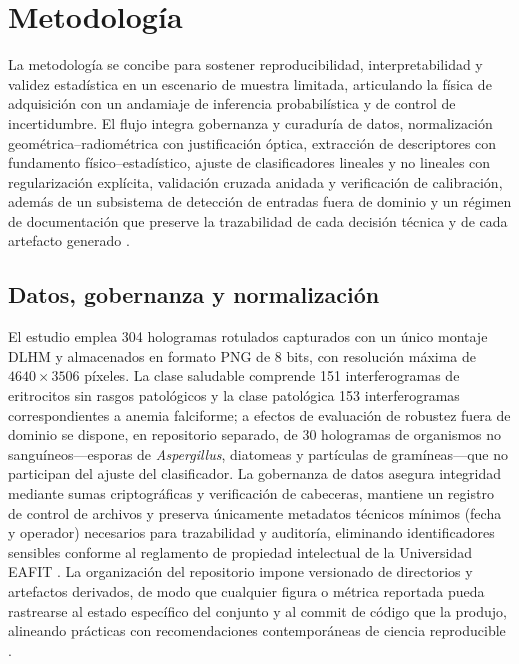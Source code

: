 \chapter{Metodología}\label{chap:metodologia}
La metodología se concibe para sostener reproducibilidad, interpretabilidad y validez estadística en un escenario de muestra limitada, articulando la física de adquisición con un andamiaje de inferencia probabilística y de control de incertidumbre. El flujo integra gobernanza y curaduría de datos, normalización geométrica–radiométrica con justificación óptica, extracción de descriptores con fundamento físico–estadístico, ajuste de clasificadores lineales y no lineales con regularización explícita, validación cruzada anidada y verificación de calibración, además de un subsistema de detección de entradas fuera de dominio y un régimen de documentación que preserve la trazabilidad de cada decisión técnica y de cada artefacto generado \cite{Tsamardinos2022,Vabalas2019,Pedregosa2011,EAFIT2018}.

\section{Datos, gobernanza y normalización}
El estudio emplea 304 hologramas rotulados capturados con un único montaje DLHM y almacenados en formato PNG de 8 bits, con resolución máxima de \(4640\times3506\) píxeles. La clase saludable comprende 151 interferogramas de eritrocitos sin rasgos patológicos y la clase patológica 153 interferogramas correspondientes a anemia falciforme; a efectos de evaluación de robustez fuera de dominio se dispone, en repositorio separado, de 30 hologramas de organismos no sanguíneos—esporas de \emph{Aspergillus}, diatomeas y partículas de gramíneas—que no participan del ajuste del clasificador. La gobernanza de datos asegura integridad mediante sumas criptográficas y verificación de cabeceras, mantiene un registro de control de archivos y preserva únicamente metadatos técnicos mínimos (fecha y operador) necesarios para trazabilidad y auditoría, eliminando identificadores sensibles conforme al reglamento de propiedad intelectual de la Universidad EAFIT \cite{EAFIT2018}. La organización del repositorio impone versionado de directorios y artefactos derivados, de modo que cualquier figura o métrica reportada pueda rastrearse al estado específico del conjunto y al commit de código que la produjo, alineando prácticas con recomendaciones contemporáneas de ciencia reproducible \cite{Tsamardinos2022}.


